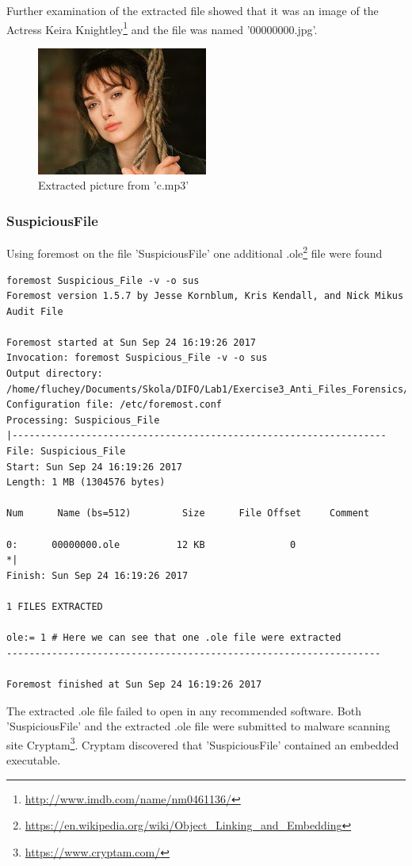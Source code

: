 \documentclass[a4paper,10pt,oneside]{article}
\begin{document}
Further examination of the extracted file showed that it was an image of the Actress Keira Knightley\footnote{\url{http://www.imdb.com/name/nm0461136/}} and the file was named '00000000.jpg'.
\begin{figure}[ht]
        \centering
        \includegraphics[width=0.5\textwidth]{00000000.jpg}
        \caption{Extracted picture from 'c.mp3'}
\end{figure}





\subsubsection{Suspicious\textunderscore File}



Using foremost on the file 'Suspicious\textunderscore File' one additional .ole\footnote{\url{https://en.wikipedia.org/wiki/Object_Linking_and_Embedding}} file were found

\begin{lstlisting}[caption= foremost file 'Suspicious\textunderscore File']
foremost Suspicious_File -v -o sus
Foremost version 1.5.7 by Jesse Kornblum, Kris Kendall, and Nick Mikus
Audit File

Foremost started at Sun Sep 24 16:19:26 2017
Invocation: foremost Suspicious_File -v -o sus
Output directory: /home/fluchey/Documents/Skola/DIFO/Lab1/Exercise3_Anti_Files_Forensics/sus
Configuration file: /etc/foremost.conf
Processing: Suspicious_File
|------------------------------------------------------------------
File: Suspicious_File
Start: Sun Sep 24 16:19:26 2017
Length: 1 MB (1304576 bytes)

Num      Name (bs=512)         Size      File Offset     Comment

0:      00000000.ole          12 KB               0
*|
Finish: Sun Sep 24 16:19:26 2017

1 FILES EXTRACTED

ole:= 1 # Here we can see that one .ole file were extracted
------------------------------------------------------------------

Foremost finished at Sun Sep 24 16:19:26 2017
\end{lstlisting}
The extracted .ole file failed to open in any recommended software. Both 'Suspicious\textunderscore File' and the extracted .ole file were submitted to malware scanning site Cryptam\footnote{\url{https://www.cryptam.com/}}.
Cryptam discovered that 'Suspicious\textunderscore File' contained an embedded executable.
\end{document}
